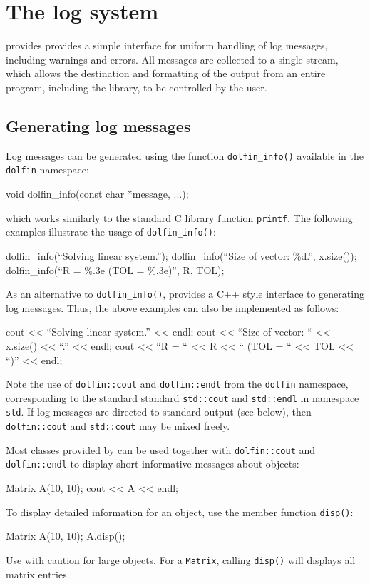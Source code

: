 \chapter{The log system}

\dolfin{} provides provides a simple interface for uniform handling of
log messages, including warnings and errors. All messages are
collected to a single stream, which allows the destination and
formatting of the output from an entire program, including the
\dolfin{} library, to be controlled by the user.

\section{Generating log messages}

Log messages can be generated using the function
\texttt{dolfin\_info()} available in the \texttt{dolfin} namespace:
\begin{code}
void dolfin_info(const char *message, ...);
\end{code}
which works similarly to the standard C library function \texttt{printf}.
The following examples illustrate the usage of
\texttt{dolfin\_info()}:
\begin{code}
dolfin_info(``Solving linear system.'');
dolfin_info(``Size of vector: \%d.'', x.size());
dolfin_info(``R = \%.3e (TOL = \%.3e)'', R, TOL);
\end{code}

As an alternative to \texttt{dolfin\_info()}, \dolfin{} provides a C++
style interface to generating log messages. Thus, the above examples
can also be implemented as follows:
\footnotesize
\begin{code}
cout << ``Solving linear system.'' << endl;
cout << ``Size of vector: `` << x.size() << ``.'' << endl;
cout << ``R = `` << R << `` (TOL = `` << TOL << ``)'' << endl;
\end{code}
\normalsize
Note the use of \texttt{dolfin::cout} and
\texttt{dolfin::endl} from the \texttt{dolfin} namespace,
corresponding to the standard standard \texttt{std::cout} and
\texttt{std::endl} in namespace \texttt{std}. If log messages are
directed to standard output (see below), then \texttt{dolfin::cout}
and \texttt{std::cout} may be mixed freely.

Most classes provided by \dolfin{} can be used together with
\texttt{dolfin::cout} and \texttt{dolfin::endl} to display short
informative messages about objects:
\begin{code}
Matrix A(10, 10);
cout << A << endl;
\end{code}
To display detailed information for an object,  use the member function
\texttt{disp()}:
\begin{code}
Matrix A(10, 10);
A.disp();
\end{code}
Use with caution for large objects. For a \texttt{Matrix}, calling
\texttt{disp()} will displays all matrix entries.

